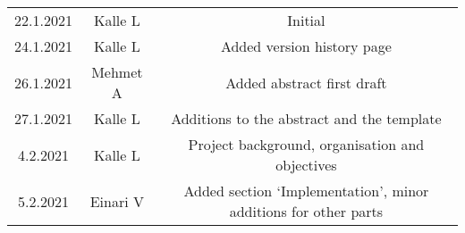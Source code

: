 \begin{center}
	\begin{tabular}{ c c c }
		22.1.2021 & Kalle L & Initial \\ 
		24.1.2021 & Kalle L & Added version history page \\
		26.1.2021 & Mehmet A & Added abstract first draft \\ 
		27.1.2021 & Kalle L & Additions to the abstract and the template \\
		4.2.2021 & Kalle L & Project background, organisation and objectives \\ 
		5.2.2021 & Einari V & Added section `Implementation', minor additions for other parts 
	\end{tabular}
\end{center}